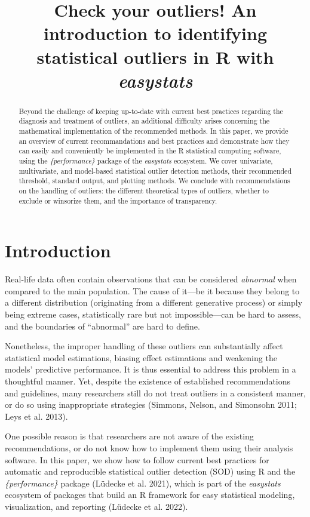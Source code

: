 \documentclass{article}
\title{Check your outliers! An introduction to identifying statistical
outliers in R with \emph{easystats}}
\author{
  }
\begin{document}
\maketitle


\begin{abstract}
Beyond the challenge of keeping up-to-date with current best practices
regarding the diagnosis and treatment of outliers, an additional
difficulty arises concerning the mathematical implementation of the
recommended methods. In this paper, we provide an overview of current
recommandations and best practices and demonstrate how they can easily
and conveniently be implemented in the R statistical computing software,
using the \emph{\{performance\}} package of the \emph{easystats}
ecosystem. We cover univariate, multivariate, and model-based
statistical outlier detection methods, their recommended threshold,
standard output, and plotting methods. We conclude with recommendations
on the handling of outliers: the different theoretical types of
outliers, whether to exclude or winsorize them, and the importance of
transparency.
\end{abstract}


\hypertarget{introduction}{%
\section{Introduction}\label{introduction}}

Real-life data often contain observations that can be considered
\emph{abnormal} when compared to the main population. The cause of
it---be it because they belong to a different distribution (originating
from a different generative process) or simply being extreme cases,
statistically rare but not impossible---can be hard to assess, and the
boundaries of ``abnormal'' are hard to define.

Nonetheless, the improper handling of these outliers can substantially
affect statistical model estimations, biasing effect estimations and
weakening the models' predictive performance. It is thus essential to
address this problem in a thoughtful manner. Yet, despite the existence
of established recommendations and guidelines, many researchers still do
not treat outliers in a consistent manner, or do so using inappropriate
strategies (Simmons, Nelson, and Simonsohn 2011; Leys et al. 2013).

One possible reason is that researchers are not aware of the existing
recommendations, or do not know how to implement them using their
analysis software. In this paper, we show how to follow current best
practices for automatic and reproducible statistical outlier detection
(SOD) using R and the \emph{\{performance\}} package (Lüdecke et al.
2021), which is part of the \emph{easystats} ecosystem of packages that
build an R framework for easy statistical modeling, visualization, and
reporting (Lüdecke et al. 2022).
\end{document}
